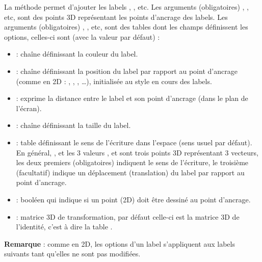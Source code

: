 La méthode  permet d'ajouter les labels , , etc. Les arguments (obligatoires) , , etc, sont des points 3D représentant les points d'ancrage des labels. Les arguments (obligatoires) , , etc, sont des tables dont les champs définissent les options, celles-ci sont (avec la valeur par défaut) :
\begin{itemize}
    \item {} : chaîne définissant la couleur du label.
    \item {} : chaîne définissant la position du label par rapport au point d'ancrage (comme en 2D : , , , \ldots),  initialisée au style en cours des labels.
    \item {} : exprime la distance entre le label et son point d'ancrage (dans le plan de l'écran).
    \item {} : chaîne définissant la taille du label.
    \item {} : table définissant le sens de l'écriture dans l'espace (sens usuel par défaut).
    En général, , et les 3 valeurs ,  et  sont trois points 3D représentant 3 vecteurs, les deux premiers (obligatoires) indiquent le sens de l'écriture, le troisième (facultatif) indique un déplacement (translation) du label par rapport au point d'ancrage.
    \item {} : booléen qui indique si un point (2D) doit être dessiné au point d'ancrage.
    \item {} : matrice 3D de transformation, par défaut celle-ci est la matrice 3D de l'identité, c'est à dire la table .
\end{itemize}

\textbf{Remarque} : comme en 2D, les options d'un label s'appliquent aux labels suivants tant qu'elles ne sont pas modifiées.

